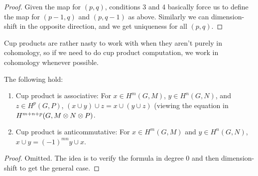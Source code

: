 \begin{proof}
Given the map for $(p,q)$, conditions 3 and 4 basically force us to define the map for $(p-1,q)$ and $(p,q-1)$ as above. Similarly we can dimension-shift in the opposite direction, and we get uniqueness for all $(p,q)$.
\end{proof}
Cup products are rather nasty to work with when they aren't purely in cohomology, so if we need to do cup product computation, we work in cohomology whenever possible.
\begin{pr}
The following hold:
\begin{enumerate}
\item
Cup product is associative: For $x\in H^m(G,M)$, $y\in H^n(G,N)$, and $z\in H^p(G,P)$, 
$(x\cup y)\cup z=x\cup (y\cup z)$ (viewing the equation in $H^{m+n+p}(G,M\otimes N\otimes P)$.
\item
Cup product is anticommutative: For $x\in H^m(G,M)$ and $y\in H^n(G,N)$, $x\cup y=(-1)^{mn} y \cup x$. 
\end{enumerate}
\end{pr}
\begin{proof}
Omitted. The idea is to verify the formula in degree 0 and then dimension-shift to get the general case.
\end{proof}
